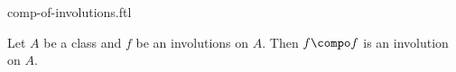 \documentclass{stex}
\begin{document}
\begin{smodule}{comp-of-involutions.ftl}


\begin{proposition}[forthel,id=CompOfEqualInvolsIsInvolProp]
  Let $A$ be a class and $f$ be an involutions on $A$.
  Then $f \compo f$ is an involution on $A$.
\end{proposition}

\end{smodule}
\end{document}
